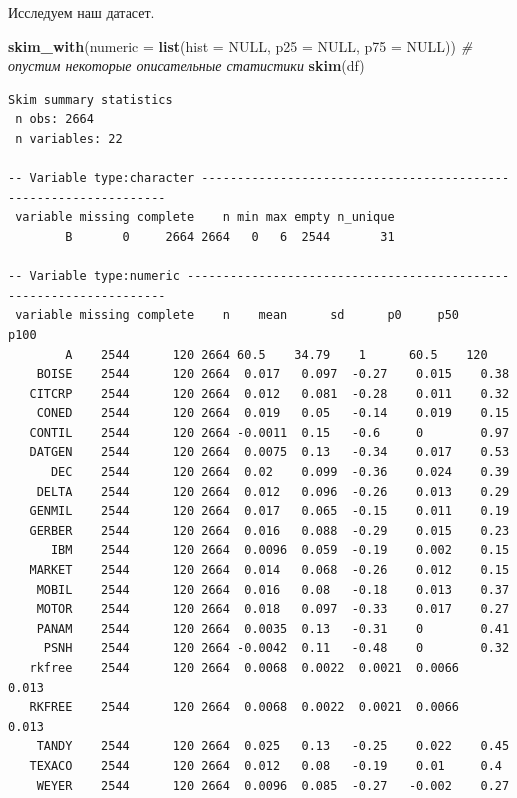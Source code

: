 \documentclass[]{book}
\newenvironment{Shaded}{\begin{snugshade}}{\end{snugshade}}
\newcommand{\CommentTok}[1]{\textcolor[rgb]{0.56,0.35,0.01}{\textit{#1}}}
\newcommand{\DataTypeTok}[1]{\textcolor[rgb]{0.13,0.29,0.53}{#1}}
\newcommand{\KeywordTok}[1]{\textcolor[rgb]{0.13,0.29,0.53}{\textbf{#1}}}
\newcommand{\NormalTok}[1]{#1}
\newcommand{\OtherTok}[1]{\textcolor[rgb]{0.56,0.35,0.01}{#1}}
\begin{document}
Исследуем наш датасет.

\begin{Shaded}
\begin{Highlighting}[]
\KeywordTok{skim_with}\NormalTok{(}\DataTypeTok{numeric =} \KeywordTok{list}\NormalTok{(}\DataTypeTok{hist =} \OtherTok{NULL}\NormalTok{, }\DataTypeTok{p25 =} \OtherTok{NULL}\NormalTok{, }\DataTypeTok{p75 =} \OtherTok{NULL}\NormalTok{)) }\CommentTok{# опустим некоторые описательные статистики}
\KeywordTok{skim}\NormalTok{(df) }
\end{Highlighting}
\end{Shaded}

\begin{verbatim}
Skim summary statistics
 n obs: 2664 
 n variables: 22 

-- Variable type:character -----------------------------------------------------------------
 variable missing complete    n min max empty n_unique
        B       0     2664 2664   0   6  2544       31

-- Variable type:numeric -------------------------------------------------------------------
 variable missing complete    n    mean      sd      p0     p50    p100
        A    2544      120 2664 60.5    34.79    1      60.5    120    
    BOISE    2544      120 2664  0.017   0.097  -0.27    0.015    0.38 
   CITCRP    2544      120 2664  0.012   0.081  -0.28    0.011    0.32 
    CONED    2544      120 2664  0.019   0.05   -0.14    0.019    0.15 
   CONTIL    2544      120 2664 -0.0011  0.15   -0.6     0        0.97 
   DATGEN    2544      120 2664  0.0075  0.13   -0.34    0.017    0.53 
      DEC    2544      120 2664  0.02    0.099  -0.36    0.024    0.39 
    DELTA    2544      120 2664  0.012   0.096  -0.26    0.013    0.29 
   GENMIL    2544      120 2664  0.017   0.065  -0.15    0.011    0.19 
   GERBER    2544      120 2664  0.016   0.088  -0.29    0.015    0.23 
      IBM    2544      120 2664  0.0096  0.059  -0.19    0.002    0.15 
   MARKET    2544      120 2664  0.014   0.068  -0.26    0.012    0.15 
    MOBIL    2544      120 2664  0.016   0.08   -0.18    0.013    0.37 
    MOTOR    2544      120 2664  0.018   0.097  -0.33    0.017    0.27 
    PANAM    2544      120 2664  0.0035  0.13   -0.31    0        0.41 
     PSNH    2544      120 2664 -0.0042  0.11   -0.48    0        0.32 
   rkfree    2544      120 2664  0.0068  0.0022  0.0021  0.0066   0.013
   RKFREE    2544      120 2664  0.0068  0.0022  0.0021  0.0066   0.013
    TANDY    2544      120 2664  0.025   0.13   -0.25    0.022    0.45 
   TEXACO    2544      120 2664  0.012   0.08   -0.19    0.01     0.4  
    WEYER    2544      120 2664  0.0096  0.085  -0.27   -0.002    0.27 
\end{verbatim}
\end{document}
